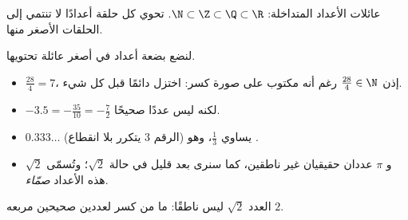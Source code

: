 \begin{omfigure}

{\small عائلات الأعداد المتداخلة: $\N \subset \Z \subset \Q \subset
\R$. تحوي كل حلقة أعدادًا لا تنتمي إلى الحلقات الأصغر منها.}
\end{omfigure}

\begin{example}\label{ex:g10:numbers:classify}
لنضع بضعة أعداد في أصغر عائلة تحتويها.
\begin{itemize}
  \item $\frac{28}{4} = 7$، إذن $\frac{28}{4} \in \N$ رغم أنه مكتوب
        على صورة كسر: اختزل دائمًا قبل كل شيء.
  \item $-3.5 = -\frac{35}{10} = -\frac72$  لكنه ليس عددًا صحيحًا.
  \item $0.333\dots$ (الرقم $3$ يتكرر بلا انقطاع) يساوي $\frac13$،
        وهو .
  \item $\sqrt 2$ و $\pi$ عددان حقيقيان غير ناطقين، كما سنرى بعد قليل
        في حالة $\sqrt 2$؛ وتُسمّى هذه الأعداد
        \emph{صمّاء}.
\end{itemize}
\end{example}

\begin{theorem}\label{thm:g10:numbers:sqrt2}
العدد $\sqrt 2$ ليس ناطقًا: ما من كسر لعددين صحيحين مربعه
$2$.
\end{theorem}

